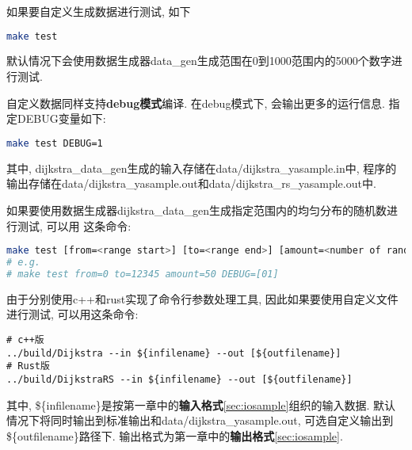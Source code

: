 如果要自定义生成数据进行测试, 如下
\begin{lstlisting}[language=bash]
make test
\end{lstlisting}
默认情况下会使用数据生成器data\_gen生成范围在0到1000范围内的5000个数字进行测试.\par

自定义数据同样支持\textbf{debug模式}编译. 在debug模式下, 会输出更多的运行信息.
指定DEBUG变量如下:
\begin{lstlisting}[language=bash]
make test DEBUG=1
\end{lstlisting}

其中, dijkstra\_data\_gen生成的输入存储在data/dijkstra\_yasample.in中,
程序的输出存储在data/dijkstra\_yasample.out和data/dijkstra\_rs\_yasample.out中. \par

如果要使用数据生成器dijkstra\_data\_gen生成指定范围内的均匀分布的随机数进行测试, 可以用
这条命令:
\begin{lstlisting}[language=bash]
make test [from=<range start>] [to=<range end>] [amount=<number of random numbers>]
# e.g. 
# make test from=0 to=12345 amount=50 DEBUG=[01]
\end{lstlisting}

由于分别使用c++和rust实现了命令行参数处理工具, 因此如果要使用自定义文件进行测试,
可以用这条命令:
\begin{lstlisting}
# c++版
../build/Dijkstra --in ${infilename} --out [${outfilename}]
# Rust版
../build/DijkstraRS --in ${infilename} --out [${outfilename}]
\end{lstlisting}
其中, \$\{infilename\}是按第一章中的\textbf{输入格式}\ref{sec:iosample}组织的输入数据.
默认情况下将同时输出到标准输出和data/dijkstra_yasample.out, 可选自定义输出到
\$\{outfilename\}路径下. 输出格式为第一章中的\textbf{输出格式}\ref{sec:iosample}.

